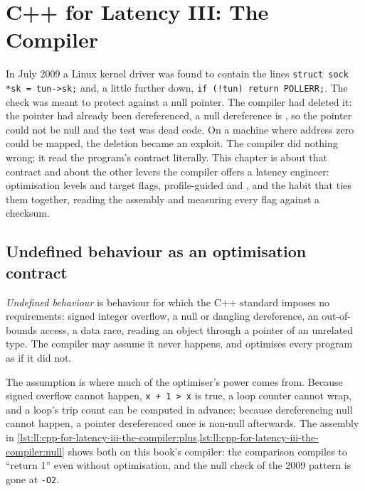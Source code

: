 \chapter{C++ for Latency III: The Compiler}\label{ch:ll:cpp-for-latency-iii-the-compiler}

In July 2009 a Linux kernel driver was found to contain the lines \texttt{struct sock *sk = tun->sk;} and, a little
further down, \texttt{if (!tun) return POLLERR;}. The check was meant to protect against a null pointer. The compiler had
deleted it: the pointer had already been dereferenced, a null dereference is , so the pointer could not
be null and the test was dead code. On a machine where address zero could be mapped, the deletion became an exploit. The
compiler did nothing wrong; it read the program's contract literally. This chapter is about that contract and about the
other levers the compiler offers a latency engineer: optimisation levels and target flags, profile-guided and , and the habit that ties them together, reading the assembly and measuring every flag against a checksum.

\section{Undefined behaviour as an optimisation contract}

\begin{definition}\label{def:ll:cpp-for-latency-iii-the-compiler:ub}
\emph{Undefined behaviour} is behaviour for which the C++ standard imposes no requirements:
signed integer overflow, a null or dangling dereference, an out-of-bounds access, a data race, reading an object through a
pointer of an unrelated type. The compiler may assume it never happens, and optimises every program as if it did not.
\end{definition}

The assumption is where much of the optimiser's power comes from. Because signed overflow cannot happen, \texttt{x + 1 > x}
is true, a loop counter cannot wrap, and a loop's trip count can be computed in advance; because dereferencing null cannot
happen, a pointer dereferenced once is non-null afterwards. The assembly in
\cref{lst:ll:cpp-for-latency-iii-the-compiler:plus,lst:ll:cpp-for-latency-iii-the-compiler:null} shows both on this book's
compiler: the comparison compiles to ``return 1'' even without optimisation, and the null check of the 2009 pattern is gone
at \texttt{-O2}.

